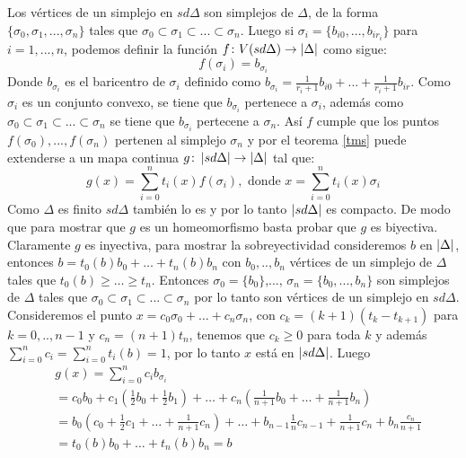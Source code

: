 \begin{Dem}
Los vértices de un simplejo en $sd\Delta$ son simplejos de $\Delta$, de la forma $\{\sigma_0,\sigma_1,...,\sigma_n\}$ tales que $\sigma_0\subset \sigma_1\subset...\subset\sigma_n$.
Luego si $\sigma_i = \{b_{i0},...,b_{ir_i}\}$ para $i = 1,...,n$, podemos definir la función $f\colon V(sd\Delta) \rightarrow \left| \Delta \right|$ como sigue:
\begin{equation*}
f(\sigma_{i})= b_{\sigma_{i}}
\end{equation*}
Donde $b_{\sigma_{i}}$ es el baricentro de $\sigma_{i}$ definido como $b_{\sigma_i} = \frac{1}{r_i+1}b_{i0}+...+\frac{1}{r_i+1}b_{ir}$.
Como $\sigma_{i}$ es un conjunto convexo, se tiene que $b_{\sigma_{i}}$ pertenece a $\sigma_{i}$, además como $\sigma_0\subset \sigma_1\subset...\subset\sigma_n$ se tiene que $b_{\sigma_{i}}$ pertecene a $\sigma_{n}$.
Así $f$ cumple que los puntos $f(\sigma_0),...,f(\sigma_n)$ pertenen al simplejo $\sigma_{n}$ y por el teorema \ref{tms} puede extenderse a un mapa continua $g\colon \left| sd\Delta \right|\rightarrow\left| \Delta \right|$ tal que:
\begin{equation*}
g(x)= \sum_{i=0}^{n}t_i(x)f(\sigma_i), \textrm{ donde }  x= \sum_{i=0}^{n}t_i(x)\sigma_i
\end{equation*}
Como $\Delta$ es finito $sd\Delta$ también lo es y por lo tanto $\left| sd\Delta \right|$ es compacto. De modo que para mostrar que $g$ es un homeomorfismo basta probar que $g$ es biyectiva.
Claramente $g$ es inyectiva, para mostrar la sobreyectividad consideremos $b$ en $\left| \Delta \right|$, entonces $b = t_0(b)b_0 +\dots +t_n(b)b_n$ con $b_0,..,b_n$ vértices de un simplejo de $\Delta$ tales que $t_0(b)\geq \dots\geq t_n$.
Entonces $\sigma_0 = \{b_0\}$,..., $\sigma_n = \{b_0,...,b_n\}$ son simplejos de $\Delta$ tales que $\sigma_0\subset \sigma_1\subset...\subset\sigma_n$ por lo tanto son vértices de un simplejo en $sd\Delta$.
Consideremos el punto $x = c_0\sigma_0+\dots+c_n\sigma_n$, con $c_k = (k+1)(t_k-t_{k+1})$ para $k = 0,..,n-1$ y $c_n = (n+1)t_n$, tenemos que $c_k\geq 0$ para toda $k$ y además 
$\sum_{i= 0}^{n}c_i = \sum_{i = 0}^{n}t_i(b) = 1$, por lo tanto $x$ está en $\left| sd\Delta \right|$. 
Luego
\begin{align*}
&g(x) = \sum_{i = 0}^{n}c_ib_{\sigma_i}\\
&=c_0b_0 + c_1(\frac{1}{2}b_0 + \frac{1}{2}b_1)+\dots +c_n(\frac{1}{n+1}b_0+\dots +\frac{1}{n+1}b_n)\\
&= b_0(c_0+ \frac{1}{2}c_1+\dots + \frac{1}{n+1}c_n)+\dots +b_{n-1}{\frac{1}{n}c_{n-1}+\frac{1}{n+1}c_n} + b_n\frac{c_n}{n+1}\\
&= t_0(b)b_0+\dots +t_n(b)b_n = b
\end{align*}  
\end{Dem}

